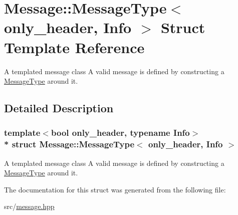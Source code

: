 \hypertarget{struct_message_1_1_message_type}{}\section{Message\+:\+:Message\+Type$<$ only\+\_\+header, Info $>$ Struct Template Reference}
\label{struct_message_1_1_message_type}


A templated message class A valid message is defined by constructing a \hyperlink{struct_message_1_1_message_type}{Message\+Type} around it.  




\subsection{Detailed Description}
\subsubsection*{template$<$bool only\+\_\+header, typename Info$>$\\*
struct Message\+::\+Message\+Type$<$ only\+\_\+header, Info $>$}

A templated message class A valid message is defined by constructing a \hyperlink{struct_message_1_1_message_type}{Message\+Type} around it. 

The documentation for this struct was generated from the following file\+:\begin{DoxyCompactItemize}
\item 
src/\hyperlink{message_8hpp}{message.\+hpp}\end{DoxyCompactItemize}
